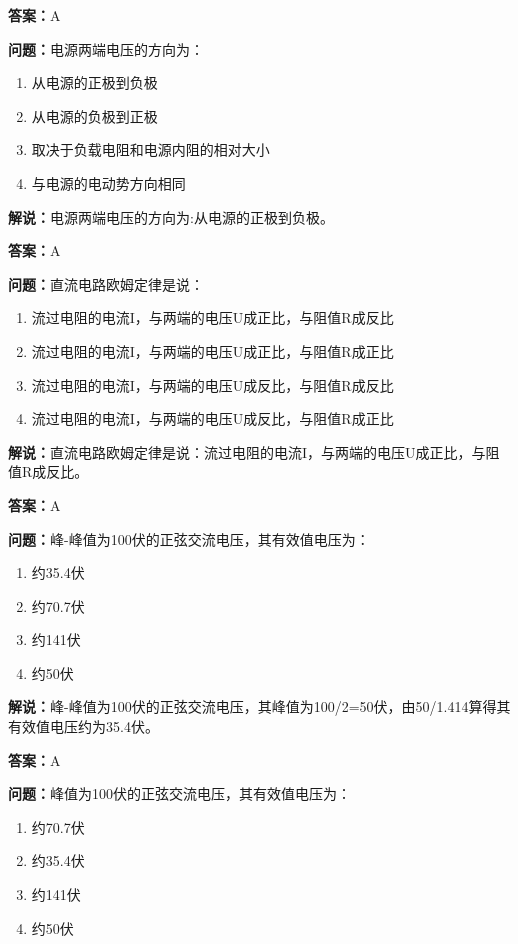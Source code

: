 \textbf{答案：}A

\textbf{问题：}电源两端电压的方向为：

\begin{enumerate}[label=\Alph*), leftmargin=3em]
	\item 从电源的正极到负极
	\item 从电源的负极到正极
	\item 取决于负载电阻和电源内阻的相对大小
	\item 与电源的电动势方向相同
\end{enumerate}

\textbf{解说：}电源两端电压的方向为:从电源的正极到负极。

\textbf{答案：}A

\textbf{问题：}直流电路欧姆定律是说：

\begin{enumerate}[label=\Alph*), leftmargin=3em]
	\item 流过电阻的电流I，与两端的电压U成正比，与阻值R成反比
	\item 流过电阻的电流I，与两端的电压U成正比，与阻值R成正比
	\item 流过电阻的电流I，与两端的电压U成反比，与阻值R成反比
	\item 流过电阻的电流I，与两端的电压U成反比，与阻值R成正比
\end{enumerate}

\textbf{解说：}直流电路欧姆定律是说：流过电阻的电流I，与两端的电压U成正比，与阻值R成反比。%

\textbf{答案：}A

\textbf{问题：}峰-峰值为100伏的正弦交流电压，其有效值电压为：

\begin{enumerate}[label=\Alph*), leftmargin=3em]
	\item 约35.4伏
	\item 约70.7伏
	\item 约141伏
	\item 约50伏
\end{enumerate}

\textbf{解说：}峰-峰值为100伏的正弦交流电压，其峰值为100/2=50伏，由50/1.414算得其有效值电压约为35.4伏。%

\textbf{答案：}A

\textbf{问题：}峰值为100伏的正弦交流电压，其有效值电压为：

\begin{enumerate}[label=\Alph*), leftmargin=3em]
	\item 约70.7伏
	\item 约35.4伏
	\item 约141伏
	\item 约50伏
\end{enumerate}

